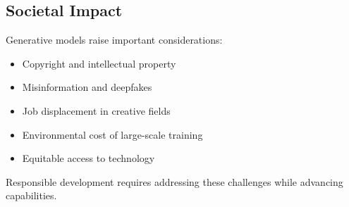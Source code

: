 \subsection{Societal Impact}

Generative models raise important considerations:
\begin{itemize}
    \item Copyright and intellectual property
    \item Misinformation and deepfakes
    \item Job displacement in creative fields
    \item Environmental cost of large-scale training
    \item Equitable access to technology
\end{itemize}

Responsible development requires addressing these challenges while advancing capabilities.
